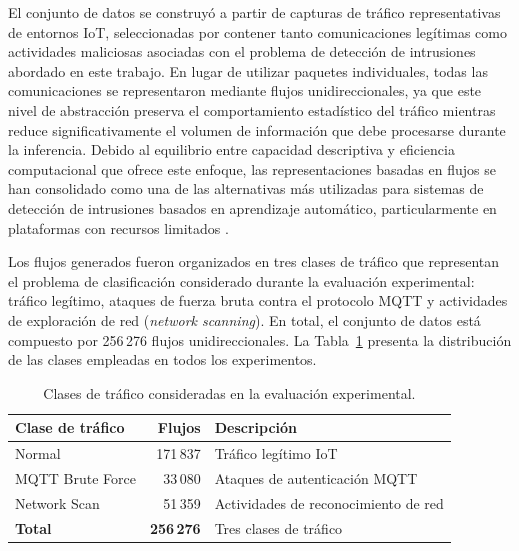 \documentclass[journal,article,submit,moreauthors]{Definitions/mdpi}
\begin{document}
El conjunto de datos se construyó a partir de capturas de tráfico representativas de entornos IoT, seleccionadas por contener tanto comunicaciones legítimas como actividades maliciosas asociadas con el problema de detección de intrusiones abordado en este trabajo. En lugar de utilizar paquetes individuales, todas las comunicaciones se representaron mediante flujos unidireccionales, ya que este nivel de abstracción preserva el comportamiento estadístico del tráfico mientras reduce significativamente el volumen de información que debe procesarse durante la inferencia. Debido al equilibrio entre capacidad descriptiva y eficiencia computacional que ofrece este enfoque, las representaciones basadas en flujos se han consolidado como una de las alternativas más utilizadas para sistemas de detección de intrusiones basados en aprendizaje automático, particularmente en plataformas con recursos limitados \cite{Moustafa2019,CICIoT2023}.

Los flujos generados fueron organizados en tres clases de tráfico que representan el problema de clasificación considerado durante la evaluación experimental: tráfico legítimo, ataques de fuerza bruta contra el protocolo MQTT y actividades de exploración de red (\textit{network scanning}). En total, el conjunto de datos está compuesto por 256\,276 flujos unidireccionales. La Tabla~\ref{tab:dataset_composition} presenta la distribución de las clases empleadas en todos los experimentos.

\begin{table}[ht]
\centering
\caption{Clases de tráfico consideradas en la evaluación experimental.}
\label{tab:dataset_composition}
\footnotesize
\begin{tabular}{lrl}
\toprule
\textbf{Clase de tráfico} & \textbf{Flujos} & \textbf{Descripción} \\
\midrule
Normal & 171\,837 & Tráfico legítimo IoT \\
MQTT Brute Force & 33\,080 & Ataques de autenticación MQTT \\
Network Scan & 51\,359 & Actividades de reconocimiento de red \\
\midrule
\textbf{Total} & \textbf{256\,276} & Tres clases de tráfico \\
\bottomrule
\end{tabular}
\end{table}
\end{document}
